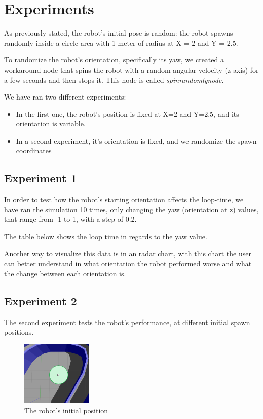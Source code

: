\documentclass[conference]{IEEEtran}
\begin{document}
\section{Experiments}

As previously stated, the robot's initial pose is random: the robot spawns randomly inside a circle area
with 1 meter of radius at X = 2 and Y = 2.5.

To randomize the robot's orientation, specifically its yaw, we created a workaround node that spins the robot
with a random angular velocity (z axis) for a few seconds and then stops it.
This node is called \emph{spin\textunderscore randomly\textunderscore node}.

We have ran two different experiments:
\begin{itemize}
    \item In the first one, the robot's position is fixed at X=2 and Y=2.5, and its orientation is variable.
    \item In a second experiment, it's orientation is fixed, and we randomize the spawn coordinates
\end{itemize}

\subsection{Experiment 1}

In order to test how the robot's starting orientation affects the loop-time, we have ran the simulation 10 times, only changing the yaw (orientation at z) values, that range from -1 to 1, with a step of 0.2.

The table below shows the loop time in regards to the yaw value.


Another way to visualize this data is in an radar chart, with this chart the user can better understand in what orientation the robot performed worse and what the change  between each orientation is. 

\subsection{Experiment 2}

The second experiment tests the robot's performance, at different initial spawn positions.

\begin{figure}[h]
    \centering
    \includegraphics[width=0.3\textwidth]{images/spawn-positions.png}
    \caption{The robot's initial position}
    \label{fig:initial-position}
\end{figure}
\end{document}
